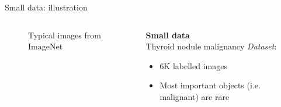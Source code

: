 \documentclass{beamer}
\begin{document}
\begin{frame}{Small data: illustration}
\begin{columns}
\begin{column}{0.48\textwidth}
\begin{figure}[!h]
			\caption{Typical images from ImageNet}
		\end{figure}
\end{column}
\hfill
\begin{column}{0.5\textwidth}  
	\footnotesize
	\center
		{\small		
		\textbf{Small data} \\
		Thyroid nodule malignancy
		}
	\vfill
	\flushleft
		\textit{Dataset}:
		\begin{itemize}
			\item 6K labelled images
			\item Most important objects (i.e. malignant) are rare
		\end{itemize}
	
		\begin{figure}[!h]
		\hfill

\end{figure}
\end{column}
\end{columns}
\end{frame}
\end{document}

